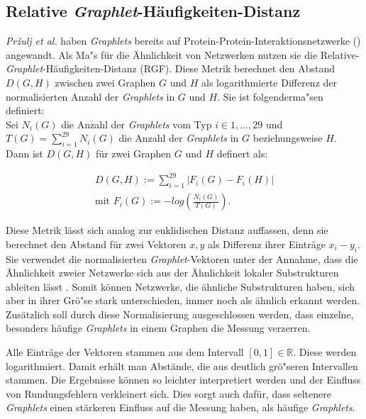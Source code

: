 \documentclass{report}
\begin{document}
\subsection{Relative \textit{Graphlet}-H\"aufigkeiten-Distanz}

\textit{Pr\v{z}ulj et al.} haben \textit{Graphlets} bereits auf Protein-Protein-Interaktionsnetzwerke (\cite{frqdistribution}) angewandt. Als Ma"s f\"ur die \"Ahnlichkeit von Netzwerken nutzen sie die Relative-\textit{Graphlet}-H\"aufigkeiten-Distanz (RGF). Diese Metrik berechnet den Abstand $D(G,H)$ zwischen zwei Graphen $G$ und $H$ als logarithmierte Differenz der normalisierten Anzahl der \textit{Graphlets} in $G$ und $H$. Sie ist folgenderma"sen definiert: \\

Sei $N_{i}(G)$ die Anzahl der \textit{Graphlets} vom Typ $i \in {1,...,29}$ und \\ $T(G) = \sum_{i = 1}^{29} N_{i}(G)$ die Anzahl der \textit{Graphlets} in $G$ beziehungsweise $H$.\\

Dann ist $D(G,H)$ f\"ur zwei Graphen $G$ und $H$ definert als:

\begin{subequations}
\begin{align*}
D(G,H) := \sum_{i = 1}^{29} | F_{i}(G) - F_{i}(H) | \\
\text{mit } F_{i}(G) := - log(\frac{N_{i}(G)}{T(G)}).
\end{align*}
\end{subequations}



Diese Metrik l\"asst sich analog zur euklidischen Distanz auffassen, denn sie berechnet den Abstand f\"ur zwei Vektoren $x,y$ als Differenz ihrer Eintr\"age $x_i -y_i$. Sie verwendet die normalisierten \textit{Graphlet}-Vektoren unter der Annahme, dass die \"Ahnlichkeit zweier Netzwerke sich aus der \"Ahnlichkeit lokaler Substrukturen ableiten l\"asst \cite{frqdistribution}. Somit k\"onnen Netzwerke, die \"ahnliche Substrukturen haben, sich aber in ihrer Gr\"o"se stark unterschieden, immer noch als \"ahnlich erkannt werden. Zus\"atzlich soll durch diese Normalisierung ausgeschlossen werden, dass einzelne, besonders h\"aufige \textit{Graphlets} in einem Graphen die Messung verzerren.

Alle Eintr\"age der Vektoren stammen aus dem Intervall $ [0,1] \in \mathbb{R} $. Diese werden logarithmiert. Damit erh\"alt man Abst\"ande, die aus deutlich gr\"o"seren Intervallen stammen. Die Ergebnisse k\"onnen so leichter interpretiert werden und der Einfluss von Rundungsfehlern verkleinert sich. Dies sorgt auch daf\"ur, dass seltenere \textit{Graphlets} einen st\"arkeren Einfluss auf die Messung haben, als h\"aufige \textit{Graphlets}.
 
\end{document}
